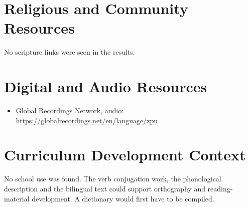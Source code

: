 \documentclass[12pt]{article}
\begin{document}
\section{Religious and Community Resources}
No scripture links were seen in the results.

\section{Digital and Audio Resources}
\begin{itemize}
\item Global Recordings Network, audio: \url{https://globalrecordings.net/en/language/zpu}
\end{itemize}

\section{Curriculum Development Context}
No school use was found. The verb conjugation work, the phonological description and the bilingual text could support orthography and reading-material development. A dictionary would first have to be compiled.
\end{document}
